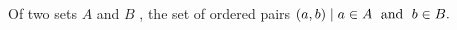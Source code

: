  Of two sets  $ A $  and  $ B $ , the set of ordered
pairs  $ \\{ (a,b) \mid a \in A \; \text{ and } \;  b \in B \\}.  $


